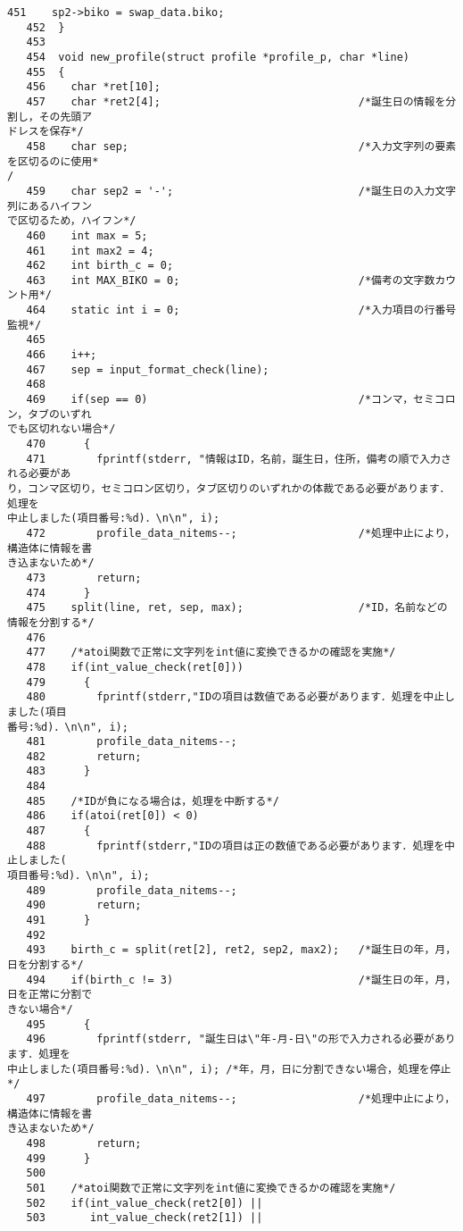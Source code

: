 \begin{Verbatim}[fontsize=\small, baselinestretch=0.8]
   451	  sp2->biko = swap_data.biko;
   452	}
   453	
   454	void new_profile(struct profile *profile_p, char *line)
   455	{
   456	  char *ret[10];
   457	  char *ret2[4];                               /*誕生日の情報を分割し，その先頭ア
ドレスを保存*/
   458	  char sep;                                    /*入力文字列の要素を区切るのに使用*
/
   459	  char sep2 = '-';                             /*誕生日の入力文字列にあるハイフン
で区切るため，ハイフン*/
   460	  int max = 5;
   461	  int max2 = 4;
   462	  int birth_c = 0;
   463	  int MAX_BIKO = 0;                            /*備考の文字数カウント用*/
   464	  static int i = 0;                            /*入力項目の行番号監視*/
   465	  
   466	  i++;
   467	  sep = input_format_check(line);
   468	
   469	  if(sep == 0)                                 /*コンマ，セミコロン，タブのいずれ
でも区切れない場合*/
   470	    {
   471	      fprintf(stderr, "情報はID，名前，誕生日，住所，備考の順で入力される必要があ
り，コンマ区切り，セミコロン区切り，タブ区切りのいずれかの体裁である必要があります．処理を
中止しました(項目番号:%d)．\n\n", i);
   472	      profile_data_nitems--;                   /*処理中止により，構造体に情報を書
き込まないため*/
   473	      return;
   474	    }
   475	  split(line, ret, sep, max);                  /*ID，名前などの情報を分割する*/
   476	
   477	  /*atoi関数で正常に文字列をint値に変換できるかの確認を実施*/
   478	  if(int_value_check(ret[0]))
   479	    {
   480	      fprintf(stderr,"IDの項目は数値である必要があります．処理を中止しました(項目
番号:%d)．\n\n", i);
   481	      profile_data_nitems--;
   482	      return;
   483	    }
   484	
   485	  /*IDが負になる場合は，処理を中断する*/
   486	  if(atoi(ret[0]) < 0)
   487	    {
   488	      fprintf(stderr,"IDの項目は正の数値である必要があります．処理を中止しました(
項目番号:%d)．\n\n", i);
   489	      profile_data_nitems--;
   490	      return;
   491	    }
   492	
   493	  birth_c = split(ret[2], ret2, sep2, max2);   /*誕生日の年，月，日を分割する*/
   494	  if(birth_c != 3)                             /*誕生日の年，月，日を正常に分割で
きない場合*/
   495	    {
   496	      fprintf(stderr, "誕生日は\"年-月-日\"の形で入力される必要があります．処理を
中止しました(項目番号:%d)．\n\n", i); /*年，月，日に分割できない場合，処理を停止*/
   497	      profile_data_nitems--;                   /*処理中止により，構造体に情報を書
き込まないため*/
   498	      return;
   499	    }
   500	
   501	  /*atoi関数で正常に文字列をint値に変換できるかの確認を実施*/
   502	  if(int_value_check(ret2[0]) ||
   503	     int_value_check(ret2[1]) ||

\end{Verbatim}
